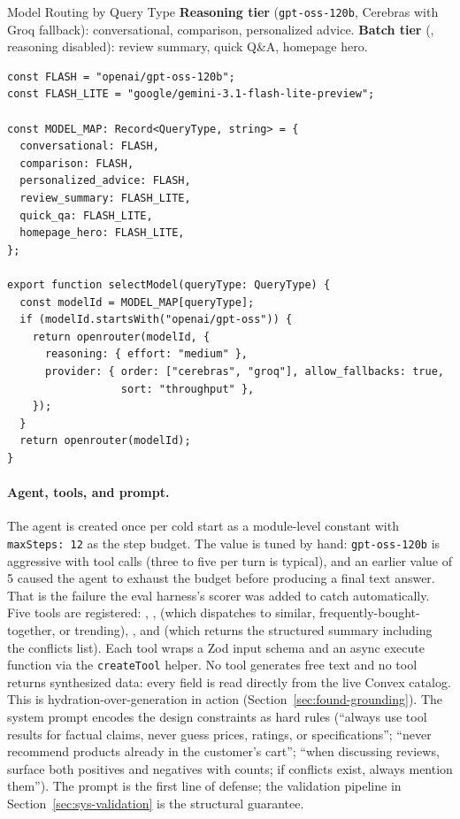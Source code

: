 \begin{calloutbox}{Model Routing by Query Type}
  \textbf{Reasoning tier} (\texttt{gpt-oss-120b}, Cerebras with
  Groq fallback): conversational, comparison, personalized advice.
  \textbf{Batch tier} (,
  reasoning disabled): review summary, quick Q\&A, homepage hero.
\end{calloutbox}

\begin{listing}[ht]
\begin{verbatim}
const FLASH = "openai/gpt-oss-120b";
const FLASH_LITE = "google/gemini-3.1-flash-lite-preview";

const MODEL_MAP: Record<QueryType, string> = {
  conversational: FLASH,
  comparison: FLASH,
  personalized_advice: FLASH,
  review_summary: FLASH_LITE,
  quick_qa: FLASH_LITE,
  homepage_hero: FLASH_LITE,
};

export function selectModel(queryType: QueryType) {
  const modelId = MODEL_MAP[queryType];
  if (modelId.startsWith("openai/gpt-oss")) {
    return openrouter(modelId, {
      reasoning: { effort: "medium" },
      provider: { order: ["cerebras", "groq"], allow_fallbacks: true,
                  sort: "throughput" },
    });
  }
  return openrouter(modelId);
}
\end{verbatim}
  \caption{The model-routing function.}
  \label{lst:select-model}
\end{listing}

\paragraph{Agent, tools, and prompt.} The agent is created
once per cold start as a module-level constant with
\texttt{maxSteps: 12} as the step budget. The value is tuned by
hand: \texttt{gpt-oss-120b} is aggressive with tool calls (three
to five per turn is typical), and an earlier value of 5 caused
the agent to exhaust the budget before producing a final text
answer. That is the failure the eval harness's
 scorer was added to catch automatically.
Five tools are registered: ,
,  (which
dispatches to similar, frequently-bought-together, or trending),
, and  (which
returns the structured summary including the conflicts list).
Each tool wraps a Zod input schema and an async execute function
via the \texttt{createTool} helper. No tool generates free text
and no tool returns synthesized data: every field is read
directly from the live Convex catalog. This is
hydration-over-generation in action
(Section~\ref{sec:found-grounding}). The system prompt encodes
the design constraints as hard rules (``always use tool results
  for factual claims, never guess prices, ratings, or
  specifications''; ``never recommend products already in the
  customer's cart''; ``when discussing reviews, surface both
  positives and negatives with counts; if conflicts exist, always
mention them''). The prompt is the first line of defense; the
validation pipeline in Section~\ref{sec:sys-validation} is the
structural guarantee.

